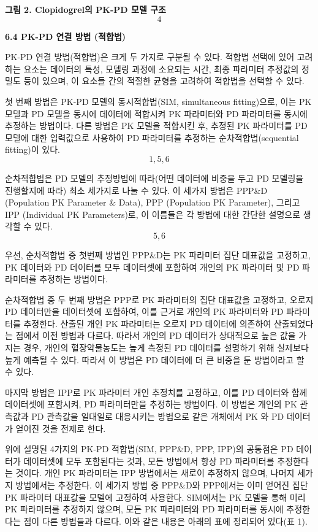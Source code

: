 \documentclass[
  10pt,
]{krantz}
\begin{document}
\textbf{그림 2. Clopidogrel의 PK-PD 모델 구조 \[4\]}

\textbf{6.4 PK-PD 연결 방법 (적합법)}

PK-PD 연결 방법(적합법)은 크게 두 가지로 구분될 수 있다. 적합법 선택에 있어 고려하는 요소는 데이터의 특성, 모델링
과정에 소요되는 시간, 최종 파라미터 추정값의 정밀도 등이 있으며, 이 요소들 간의 적절한 균형을 고려하여 적합법을
선택할 수 있다.

첫 번째 방법은 PK-PD 모델의 동시적합법(SIM, simultaneous fitting)으로, 이는 PK 모델과 PD 모델을
동시에 데이터에 적합시켜 PK 파라미터와 PD 파라미터를 동시에 추정하는 방법이다. 다른 방법은 PK 모델을 적합시킨 후,
추정된 PK 파라미터를 PD 모델에 대한 입력값으로 사용하여 PD 파라미터를 추정하는 순차적합법(sequential
fitting)이 있다. \[1,5,6\]

순차적합법은 PD 모델의 추정방법에 따라(어떤 데이터에 비중을 두고 PD 모델링을 진행할지에 따라) 최소 세가지로 나눌 수 있다.
이 세가지 방법은 PPP\&D (Population PK Parameter \& Data), PPP (Population PK
Parameter), 그리고 IPP (Individual PK Parameters)로, 이 이름들은 각 방법에 대한 간단한
설명으로 생각할 수 있다. \[5,6\]

우선, 순차적합법 중 첫번째 방법인 PPP\&D는 PK 파라미터 집단 대표값을 고정하고, PK 데이터와 PD 데이터를 모두
데이터셋에 포함하여 개인의 PK 파라미터 및 PD 파라미터를 추정하는 방법이다.

순차적합법 중 두 번째 방법은 PPP로 PK 파라미터의 집단 대표값을 고정하고, 오로지 PD 데이터만을 데이터셋에 포함하여, 이를
근거로 개인의 PK 파라미터와 PD 파라미터를 추정한다. 산출된 개인 PK 파라미터는 오로지 PD 데이터에 의존하여 산출되었다는
점에서 이전 방법과 다르다. 따라서 개인의 PD 데이터가 상대적으로 높은 값을 가지는 경우, 개인의 혈장약물농도는 높게 측정된
PD 데이터를 설명하기 위해 실제보다 높게 예측될 수 있다. 따라서 이 방법은 PD 데이터에 더 큰 비중을 둔 방법이라고 할 수
있다.

마지막 방법은 IPP로 PK 파라미터 개인 추정치를 고정하고, 이를 PD 데이터와 함께 데이터셋에 포함시켜, PD 파라미터만을
추정하는 방법이다. 이 방법은 개인의 PK 관측값과 PD 관측값을 일대일로 대응시키는 방법으로 같은 개체에서 PK 와 PD
데이터가 얻어진 것을 전제로 한다.

위에 설명된 4가지의 PK-PD 적합법(SIM, PPP\&D, PPP, IPP)의 공통점은 PD 데이터가 데이터셋에 모두
포함된다는 것과, 모든 방법에서 항상 PD 파라미터를 추정한다는 것이다. 개인 PK 파라미터는 IPP 방법에서는
새로이 추정하지 않으며, 나머지 세가지 방법에서는 추정한다. 이 세가지 방법 중 PPP\&D와 PPP에서는 이미 얻어진 집단 PK
파라미터 대표값을 모델에 고정하여 사용한다. SIM에서는 PK 모델을 통해 미리 PK 파라미터를 추정하지 않으며, 모든 PK
파라미터와 PD 파라미터를 동시에 추정한다는 점이 다른 방법들과 다르다. 이와 같은 내용은 아래의 표에 정리되어
있다(표 1).
\end{document}
